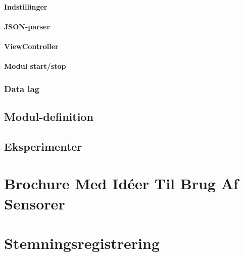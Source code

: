 \subsubsection{Indstillinger}

\subsubsection{JSON-parser}
\subsubsection{ViewController} %
\subsubsection{Modul start/stop} %

\subsection{Data lag}


\section{Modul-definition}\label{modul_definition}


\section{Eksperimenter}




\label{bib:mybiblio}

\appendix


\chapter{Brochure Med Idéer Til Brug Af Sensorer}\label{app:brochure}
 

\chapter{Stemningsregistrering}


